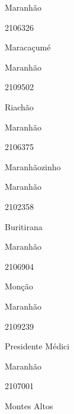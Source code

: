 \documentclass[
  letterpaper,
]{report}
\begin{document}
Maranhão

\n      

2106326

\n      

Maracaçumé

\n    

\n    

\n      

Maranhão

\n      

2109502

\n      

Riachão

\n    

\n    

\n      

Maranhão

\n      

2106375

\n      

Maranhãozinho

\n    

\n    

\n      

Maranhão

\n      

2102358

\n      

Buritirana

\n    

\n    

\n      

Maranhão

\n      

2106904

\n      

Monção

\n    

\n    

\n      

Maranhão

\n      

2109239

\n      

Presidente Médici

\n    

\n    

\n      

Maranhão

\n      

2107001

\n      

Montes Altos
\end{document}
